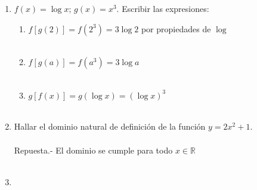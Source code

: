 \begin{enumerate}
    \item $f(x)=\log x$; $g(x)=x^3$. Escribir las expresiones:\\
	
    \begin{enumerate}[\bfseries a)]
	
	\item $f\left[g(2)\right] = f(2^3) = 3 \log 2$ por propiedades de $\log$\\\\

	\item $f\left[g(a)\right] = f(a^3) = 3\log a$\\\\

	\item $g\left[f(x)\right] = g(\log x) = (\log x)^3$\\\\

    \end{enumerate}

    \item Hallar el dominio natural de definición de la función $y=2x^2 + 1$.\\\\
	Repuesta.-\; El dominio se cumple para todo $x \in \mathbb{R}$\\\\ 

    \item 
 
\end{enumerate}

